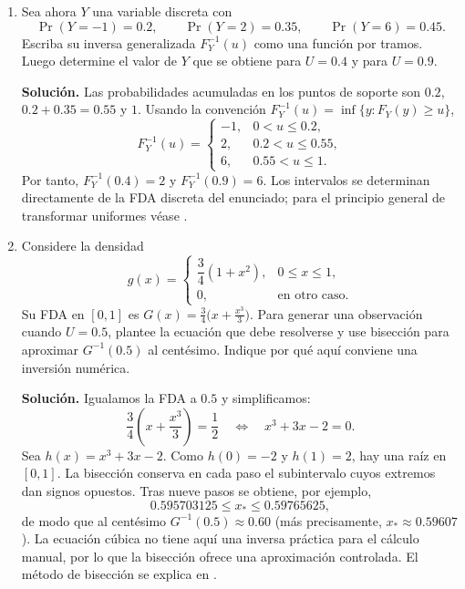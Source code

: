 \documentclass[11pt]{article}
\begin{document}
\begin{enumerate}
    \item Sea ahora $Y$ una variable discreta con
    \[
        \Pr(Y=-1)=0.2,\qquad \Pr(Y=2)=0.35,\qquad \Pr(Y=6)=0.45.
    \]
    Escriba su inversa generalizada $F_Y^{-1}(u)$ como una función por tramos.
    Luego determine el valor de $Y$ que se obtiene para $U=0.4$ y para $U=0.9$.

    \textbf{Solución.} Las probabilidades acumuladas en los puntos de soporte
    son $0.2$, $0.2+0.35=0.55$ y $1$. Usando la convención
    $F_Y^{-1}(u)=\inf\{y:F_Y(y)\geq u\}$,
    \[
        F_Y^{-1}(u)=\begin{cases}
            -1,&0<u\leq0.2,\\
            2,&0.2<u\leq0.55,\\
            6,&0.55<u\leq1.
        \end{cases}
    \]
    Por tanto, $F_Y^{-1}(0.4)=2$ y $F_Y^{-1}(0.9)=6$. Los intervalos se
    determinan directamente de la FDA discreta del enunciado; para el
    principio general de transformar uniformes véase
    \cite[Sec.~7.2]{press1992numerical}.

    \item Considere la densidad
    \[
        g(x)=\begin{cases}
            \dfrac{3}{4}(1+x^2),&0\leq x\leq1,\\
            0,&\text{en otro caso.}
        \end{cases}
    \]
    Su FDA en $[0,1]$ es $G(x)=\frac{3}{4}\bigl(x+\frac{x^3}{3}\bigr)$.
    Para generar una observación cuando $U=0.5$, plantee la ecuación que debe
    resolverse y use bisección para aproximar $G^{-1}(0.5)$ al centésimo.
    Indique por qué aquí conviene una inversión numérica.

    \textbf{Solución.} Igualamos la FDA a $0.5$ y simplificamos:
    \[
        \frac34\left(x+\frac{x^3}{3}\right)=\frac12
        \quad\Longleftrightarrow\quad x^3+3x-2=0.
    \]
    Sea $h(x)=x^3+3x-2$. Como $h(0)=-2$ y $h(1)=2$, hay una raíz en
    $[0,1]$. La bisección conserva en cada paso el subintervalo cuyos extremos
    dan signos opuestos. Tras nueve pasos se obtiene, por ejemplo,
    \[
        0.595703125\leq x_*\leq0.59765625,
    \]
    de modo que al centésimo $G^{-1}(0.5)\approx0.60$ (más precisamente,
    $x_*\approx0.59607$). La ecuación cúbica no tiene aquí una inversa
    práctica para el cálculo manual, por lo que la bisección ofrece una
    aproximación controlada. El método de bisección se explica en
    \cite[Sec.~9.1]{press1992numerical}.
\end{enumerate}



\end{document}
